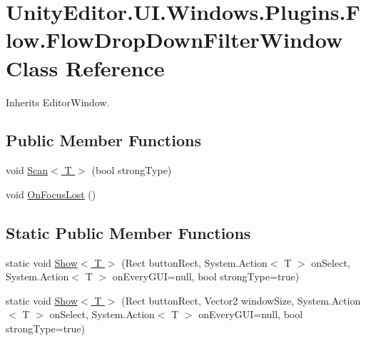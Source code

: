 \hypertarget{class_unity_editor_1_1_u_i_1_1_windows_1_1_plugins_1_1_flow_1_1_flow_drop_down_filter_window}{}\section{Unity\+Editor.\+U\+I.\+Windows.\+Plugins.\+Flow.\+Flow\+Drop\+Down\+Filter\+Window Class Reference}
\label{class_unity_editor_1_1_u_i_1_1_windows_1_1_plugins_1_1_flow_1_1_flow_drop_down_filter_window}


Inherits Editor\+Window.

\subsection*{Public Member Functions}
\begin{DoxyCompactItemize}
\item 
void \hyperlink{class_unity_editor_1_1_u_i_1_1_windows_1_1_plugins_1_1_flow_1_1_flow_drop_down_filter_window_adc107edff5665b2177b1741ab17e9985}{Scan$<$ T $>$} (bool strong\+Type)
\item 
void \hyperlink{class_unity_editor_1_1_u_i_1_1_windows_1_1_plugins_1_1_flow_1_1_flow_drop_down_filter_window_a4b6a35fdfb6f885699bd0de405516cf6}{On\+Focus\+Lost} ()
\end{DoxyCompactItemize}
\subsection*{Static Public Member Functions}
\begin{DoxyCompactItemize}
\item 
static void \hyperlink{class_unity_editor_1_1_u_i_1_1_windows_1_1_plugins_1_1_flow_1_1_flow_drop_down_filter_window_ad9f1940f22c95e2e7ab4674de98c7b4c}{Show$<$ T $>$} (Rect button\+Rect, System.\+Action$<$ T $>$ on\+Select, System.\+Action$<$ T $>$ on\+Every\+G\+U\+I=null, bool strong\+Type=true)
\item 
static void \hyperlink{class_unity_editor_1_1_u_i_1_1_windows_1_1_plugins_1_1_flow_1_1_flow_drop_down_filter_window_a6e88fb7ab88bae3b5a0c4b2a5b4b2805}{Show$<$ T $>$} (Rect button\+Rect, Vector2 window\+Size, System.\+Action$<$ T $>$ on\+Select, System.\+Action$<$ T $>$ on\+Every\+G\+U\+I=null, bool strong\+Type=true)
\end{DoxyCompactItemize}


